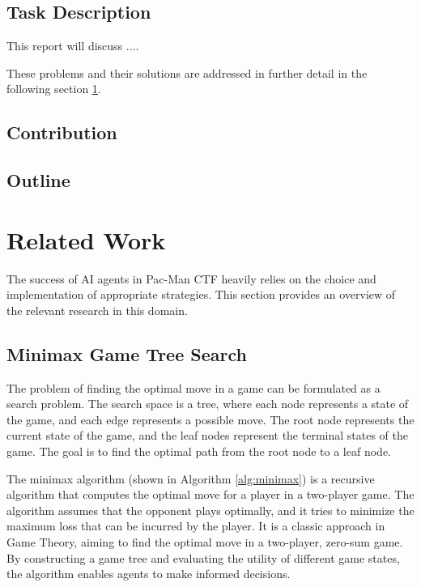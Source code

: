 \documentclass[a4paper,12pt]{article}
\begin{document}
\subsection{Task Description}

This report will discuss ....




These problems and their solutions are addressed in further detail in the following section \ref{rel_work}.




\subsection{Contribution}









\subsection{Outline}











\section{Related Work}
\label{rel_work}

The success of AI agents in Pac-Man CTF heavily relies on the choice and implementation of appropriate strategies. This section provides an overview of the relevant research in this domain.

\subsection{Minimax Game Tree Search}
\label{subsec:minimax}
The problem of finding the optimal move in a game can be formulated as a search problem. The search space is a tree, where each node represents a state of the game, and each edge represents a possible move. The root node represents the current state of the game, and the leaf nodes represent the terminal states of the game. The goal is to find the optimal path from the root node to a leaf node. 

The minimax algorithm (shown in Algorithm \ref{alg:minimax}) is a recursive algorithm that computes the optimal move for a player in a two-player game. The algorithm assumes that the opponent plays optimally, and it tries to minimize the maximum loss that can be incurred by the player. It is a classic approach in Game Theory, aiming to find the optimal move in a two-player, zero-sum game. By constructing a game tree and evaluating the utility of different game states, the algorithm enables agents to make informed decisions. 
\end{document}
